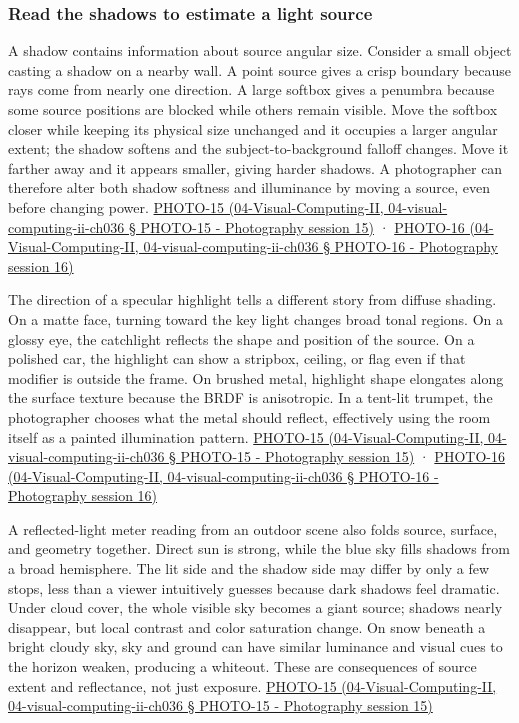 \subsubsection{Read the shadows to estimate a light source}\label{read-the-shadows-to-estimate-a-light-source}

A shadow contains information about source angular size. Consider a small object casting a shadow on a nearby wall. A point source gives a crisp boundary because rays come from nearly one direction. A large softbox gives a penumbra because some source positions are blocked while others remain visible. Move the softbox closer while keeping its physical size unchanged and it occupies a larger angular extent; the shadow softens and the subject-to-background falloff changes. Move it farther away and it appears smaller, giving harder shadows. A photographer can therefore alter both shadow softness and illuminance by moving a source, even before changing power. \href{}{PHOTO-15 (04-Visual-Computing-II, 04-visual-computing-ii-ch036 § PHOTO-15 - Photography session 15)} · \href{}{PHOTO-16 (04-Visual-Computing-II, 04-visual-computing-ii-ch036 § PHOTO-16 - Photography session 16)}

The direction of a specular highlight tells a different story from diffuse shading. On a matte face, turning toward the key light changes broad tonal regions. On a glossy eye, the catchlight reflects the shape and position of the source. On a polished car, the highlight can show a stripbox, ceiling, or flag even if that modifier is outside the frame. On brushed metal, highlight shape elongates along the surface texture because the BRDF is anisotropic. In a tent-lit trumpet, the photographer chooses what the metal should reflect, effectively using the room itself as a painted illumination pattern. \href{}{PHOTO-15 (04-Visual-Computing-II, 04-visual-computing-ii-ch036 § PHOTO-15 - Photography session 15)} · \href{}{PHOTO-16 (04-Visual-Computing-II, 04-visual-computing-ii-ch036 § PHOTO-16 - Photography session 16)}

A reflected-light meter reading from an outdoor scene also folds source, surface, and geometry together. Direct sun is strong, while the blue sky fills shadows from a broad hemisphere. The lit side and the shadow side may differ by only a few stops, less than a viewer intuitively guesses because dark shadows feel dramatic. Under cloud cover, the whole visible sky becomes a giant source; shadows nearly disappear, but local contrast and color saturation change. On snow beneath a bright cloudy sky, sky and ground can have similar luminance and visual cues to the horizon weaken, producing a whiteout. These are consequences of source extent and reflectance, not just exposure. \href{}{PHOTO-15 (04-Visual-Computing-II, 04-visual-computing-ii-ch036 § PHOTO-15 - Photography session 15)}

